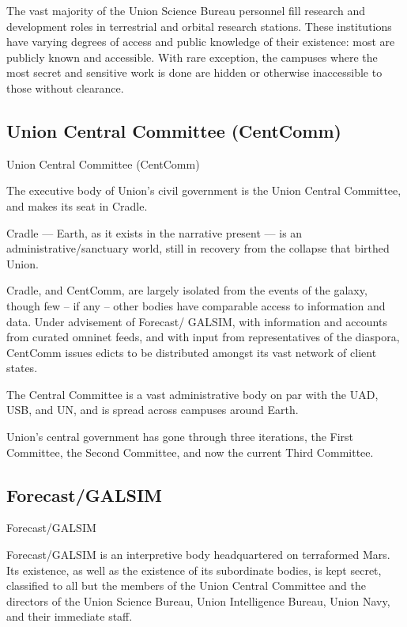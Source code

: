 The vast majority of the Union Science Bureau personnel fill research and development roles in
terrestrial and orbital research stations. These institutions have varying degrees of access and
public knowledge of their existence: most are publicly known and accessible. With rare
exception, the campuses where the most secret and sensitive work is done are hidden or
otherwise inaccessible to those without clearance.


\subsection{Union Central Committee (CentComm)}

Union Central Committee (CentComm)

The executive body of Union’s civil government is the Union Central Committee, and makes its
seat in Cradle.


Cradle — Earth, as it exists in the narrative present — is an administrative/sanctuary world, still
in recovery from the collapse that birthed Union.





Cradle, and CentComm, are largely isolated from the events of the galaxy, though few -- if any --
other bodies have comparable access to information and data. Under advisement of Forecast/
GALSIM, with information and accounts from curated omninet feeds, and with input from
representatives of the diaspora, CentComm issues edicts to be distributed amongst its vast
network of client states.


The Central Committee  is a vast administrative body on par with the UAD, USB, and UN, and is
spread across campuses around Earth.


Union’s central government has gone through three iterations, the First Committee, the Second
Committee, and now the current Third Committee.

\subsection{Forecast/GALSIM}
Forecast/GALSIM

Forecast/GALSIM is an interpretive body headquartered on terraformed Mars. Its existence, as
well as the existence of its subordinate bodies, is kept secret, classified to all but the members of
the Union Central Committee and the directors of the Union Science Bureau, Union Intelligence
Bureau, Union Navy, and their immediate staff.


